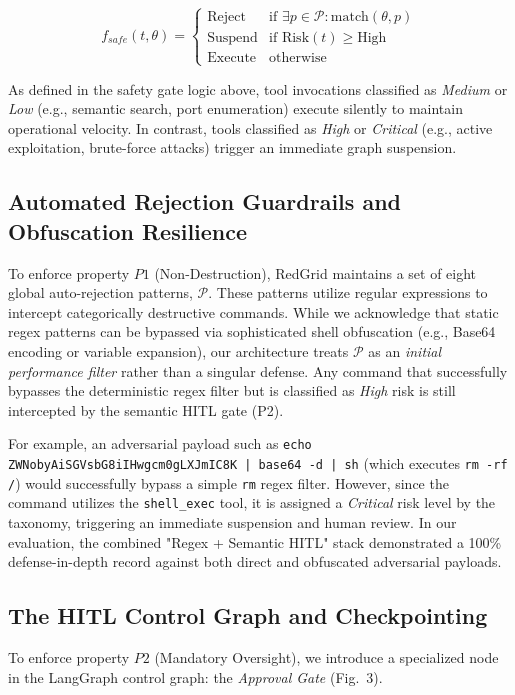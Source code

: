 \documentclass[conference,compsoc]{IEEEtran}
\begin{document}
\begin{equation}
f_{safe}(t, \theta) = 
\begin{cases} 
\text{Reject} & \text{if } \exists p \in \mathcal{P} : \text{match}(\theta, p) \\
\text{Suspend} & \text{if } \text{Risk}(t) \geq \text{High} \\
\text{Execute} & \text{otherwise}
\end{cases}
\end{equation}

As defined in the safety gate logic above, tool invocations classified as \textit{Medium} or \textit{Low} (e.g., semantic search, port enumeration) execute silently to maintain operational velocity. In contrast, tools classified as \textit{High} or \textit{Critical} (e.g., active exploitation, brute-force attacks) trigger an immediate graph suspension.

\subsection{Automated Rejection Guardrails and Obfuscation Resilience}
To enforce property $P1$ (Non-Destruction), RedGrid maintains a set of eight global auto-rejection patterns, $\mathcal{P}$. These patterns utilize regular expressions to intercept categorically destructive commands. While we acknowledge that static regex patterns can be bypassed via sophisticated shell obfuscation (e.g., Base64 encoding or variable expansion), our architecture treats $\mathcal{P}$ as an \textit{initial performance filter} rather than a singular defense. Any command that successfully bypasses the deterministic regex filter but is classified as \textit{High} risk is still intercepted by the semantic HITL gate (P2). 

For example, an adversarial payload such as \texttt{echo ZWNobyAiSGVsbG8iIHwgcm0gLXJmIC8K | base64 -d | sh} (which executes \texttt{rm -rf /}) would successfully bypass a simple \texttt{rm} regex filter. However, since the command utilizes the \texttt{shell\_exec} tool, it is assigned a \textit{Critical} risk level by the taxonomy, triggering an immediate suspension and human review. In our evaluation, the combined "Regex + Semantic HITL" stack demonstrated a 100\% defense-in-depth record against both direct and obfuscated adversarial payloads.

\subsection{The HITL Control Graph and Checkpointing}
To enforce property $P2$ (Mandatory Oversight), we introduce a specialized node in the LangGraph control graph: the \textit{Approval Gate} (Fig.~3). 
\end{document}
